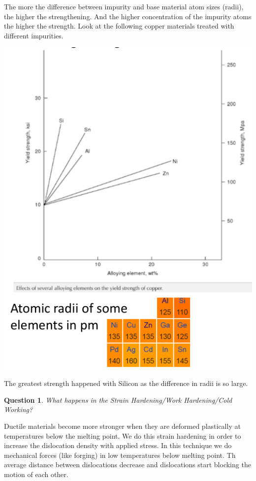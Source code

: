 \documentclass[13]{article}
\newtheorem{exer}{Question}
\begin{document}
The more the difference between impurity and base material atom sizes (radii), the higher the strengthening. And the higher concentration of the impurity atoms the higher the strength. Look at the following copper materials treated with different impurities. 
\begin{center}
\includegraphics[scale=0.5]{figures/21.png}
\end{center}
The greatest strength happened  with Silicon as the difference in radii is so large. 
\begin{exer}
What happens in the Strain Hardening/Work Hardening/Cold Working?
\end{exer}
Ductile materials become more stronger when they are deformed plastically at temperatures below the melting point. We do this strain hardening in order to increase the dislocation density with applied stress. In this technique we do mechanical forces (like forging) in low temperatures below melting point. Th average distance between dislocations decrease and dislocations start blocking the motion of each other.
\end{document}
